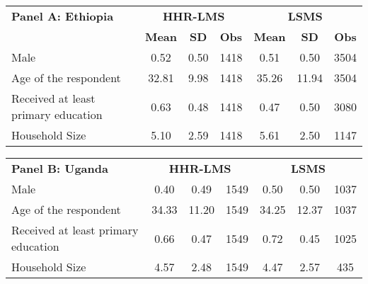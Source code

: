 \begin{tabular}{lcccccc} \toprule
\textbf{Panel A: Ethiopia} & \multicolumn{3}{c}{\textbf{HHR-LMS}} & \multicolumn{3}{c}{\textbf{LSMS}} \\
\cmidrule(lr){2-4} \cmidrule(lr){5-7}
& \textbf{Mean} & \textbf{SD} & \textbf{Obs} & \textbf{Mean} & \textbf{SD} & \textbf{Obs} \\ \midrule
\midrule
Male                &        0.52&        0.50&        1418&        0.51&        0.50&        3504\\
Age of the respondent&       32.81&        9.98&        1418&       35.26&       11.94&        3504\\
Received at least primary education&        0.63&        0.48&        1418&        0.47&        0.50&        3080\\



Household Size      &        5.10&        2.59&        1418&        5.61&        2.50&        1147\\
\bottomrule  \end{tabular}  
\begin{tabular}{lcccccc} 
\textbf{Panel B: Uganda} & \multicolumn{3}{c}{\textbf{HHR-LMS}} & \multicolumn{3}{c}{\textbf{LSMS}} \\
\cmidrule(lr){2-4} \cmidrule(lr){5-7}

Male                &        0.40&        0.49&        1549&        0.50&        0.50&        1037\\
Age of the respondent&       34.33&       11.20&        1549&       34.25&       12.37&        1037\\
Received at least primary education&        0.66&        0.47&        1549&        0.72&        0.45&        1025\\



Household Size      &        4.57&        2.48&        1549&        4.47&        2.57&         435\\
\bottomrule  \end{tabular}  
